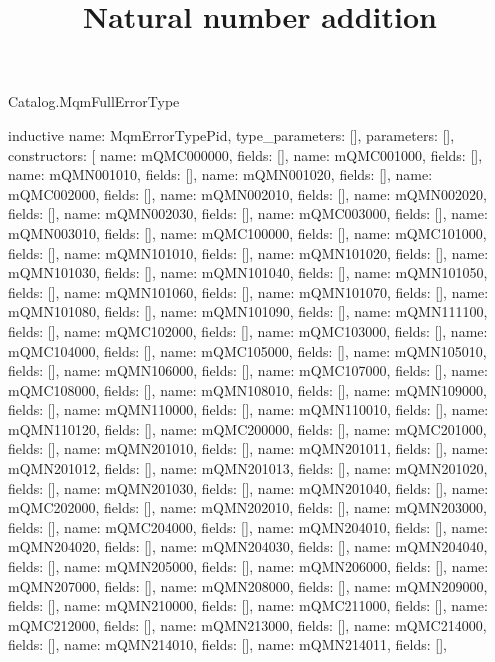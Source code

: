 \begin{lexlean}{Catalog.MqmFullErrorType}
\title{Natural number addition}
\begin{semanticmodule}
inductive{
  name: MqmErrorTypePid,
  type_parameters: [],
  parameters: [],
  constructors: [
    {name: mQMC000000, fields: []},
    {name: mQMC001000, fields: []},
    {name: mQMN001010, fields: []},
    {name: mQMN001020, fields: []},
    {name: mQMC002000, fields: []},
    {name: mQMN002010, fields: []},
    {name: mQMN002020, fields: []},
    {name: mQMN002030, fields: []},
    {name: mQMC003000, fields: []},
    {name: mQMN003010, fields: []},
    {name: mQMC100000, fields: []},
    {name: mQMC101000, fields: []},
    {name: mQMN101010, fields: []},
    {name: mQMN101020, fields: []},
    {name: mQMN101030, fields: []},
    {name: mQMN101040, fields: []},
    {name: mQMN101050, fields: []},
    {name: mQMN101060, fields: []},
    {name: mQMN101070, fields: []},
    {name: mQMN101080, fields: []},
    {name: mQMN101090, fields: []},
    {name: mQMN111100, fields: []},
    {name: mQMC102000, fields: []},
    {name: mQMC103000, fields: []},
    {name: mQMC104000, fields: []},
    {name: mQMC105000, fields: []},
    {name: mQMN105010, fields: []},
    {name: mQMN106000, fields: []},
    {name: mQMC107000, fields: []},
    {name: mQMC108000, fields: []},
    {name: mQMN108010, fields: []},
    {name: mQMN109000, fields: []},
    {name: mQMN110000, fields: []},
    {name: mQMN110010, fields: []},
    {name: mQMN110120, fields: []},
    {name: mQMC200000, fields: []},
    {name: mQMC201000, fields: []},
    {name: mQMN201010, fields: []},
    {name: mQMN201011, fields: []},
    {name: mQMN201012, fields: []},
    {name: mQMN201013, fields: []},
    {name: mQMN201020, fields: []},
    {name: mQMN201030, fields: []},
    {name: mQMN201040, fields: []},
    {name: mQMC202000, fields: []},
    {name: mQMN202010, fields: []},
    {name: mQMN203000, fields: []},
    {name: mQMC204000, fields: []},
    {name: mQMN204010, fields: []},
    {name: mQMN204020, fields: []},
    {name: mQMN204030, fields: []},
    {name: mQMN204040, fields: []},
    {name: mQMN205000, fields: []},
    {name: mQMN206000, fields: []},
    {name: mQMN207000, fields: []},
    {name: mQMN208000, fields: []},
    {name: mQMN209000, fields: []},
    {name: mQMN210000, fields: []},
    {name: mQMC211000, fields: []},
    {name: mQMC212000, fields: []},
    {name: mQMN213000, fields: []},
    {name: mQMC214000, fields: []},
    {name: mQMN214010, fields: []},
    {name: mQMN214011, fields: []},
}
\end{semanticmodule}
\end{lexlean}
